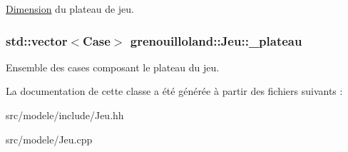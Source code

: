 \hyperlink{classgrenouilloland_1_1Dimension}{Dimension} du plateau de jeu. \hypertarget{classgrenouilloland_1_1Jeu_a868edb9c732e86197a14cef627852648}{
\subsubsection[{\-\_\-plateau}]{\setlength{\rightskip}{0pt plus 5cm}std\-::vector$<${\bf Case}$>$ grenouilloland\-::\-Jeu\-::\-\_\-plateau\hspace{0.3cm}{\ttfamily [protected]}}}\label{classgrenouilloland_1_1Jeu_a868edb9c732e86197a14cef627852648}
Ensemble des cases composant le plateau du jeu. 

La documentation de cette classe a été générée à partir des fichiers suivants \-:\begin{DoxyCompactItemize}
\item 
src/modele/include/Jeu.\-hh\item 
src/modele/Jeu.\-cpp\end{DoxyCompactItemize}
